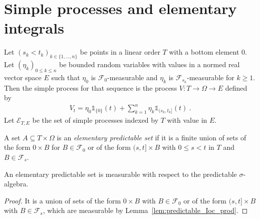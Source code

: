 \chapter{Simple processes and elementary integrals}


\begin{definition}\label{def:simpleProcess}
  \leanok
Let $(s_k < t_k)_{k \in \{1, ..., n\}}$ be points in a linear order $T$ with a bottom element 0.
Let $(\eta_k)_{0 \le k \le n}$ be bounded random variables with values in a normed real vector space $E$ such that $\eta_0$ is $\mathcal{F}_0$-measurable and $\eta_k$ is $\mathcal{F}_{s_k}$-measurable for $k \ge 1$.
Then the simple process for that sequence is the process $V : T \to \Omega \to E$ defined by
\begin{align*}
  V_t = \eta_0 \mathbb{1}_{\{0\}}(t) + \sum_{k=1}^{n} \eta_k \mathbb{1}_{(s_k, t_k]}(t)
  \: .
\end{align*}
Let $\mathcal{E}_{T, E}$ be the set of simple processes indexed by $T$ with value in $E$.
\end{definition}


\begin{definition}\label{def:elementaryPredictableSet}
  \leanok
A set $A \subseteq T \times \Omega$ is an \emph{elementary predictable set} if it is a finite union of sets of the form ${0} \times B$ for $B \in \mathcal{F}_0$ or of the form $(s, t] \times B$ with $0 \le s < t$ in $T$ and $B \in \mathcal{F}_s$.
\end{definition}


\begin{lemma}\label{lem:predictableSet_elementaryPredictableSet}
  \leanok
An elementary predictable set is measurable with respect to the predictable $\sigma$-algebra.
\end{lemma}

\begin{proof}
  \leanok
It is a union of sets of the form ${0} \times B$ with $B \in \mathcal{F}_0$ or of the form $(s, t] \times B$ with $B \in \mathcal{F}_s$, which are measurable by Lemma~\ref{lem:predictable_Ioc_prod}.
\end{proof}


